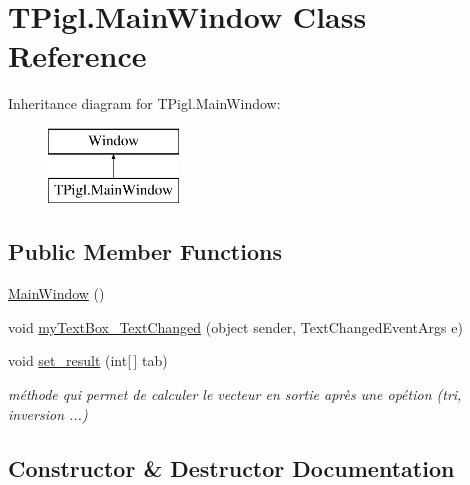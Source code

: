 \hypertarget{class_t_pigl_1_1_main_window}{}\section{T\+Pigl.\+Main\+Window Class Reference}
\label{class_t_pigl_1_1_main_window}
Inheritance diagram for T\+Pigl.\+Main\+Window\+:\begin{figure}[H]
\begin{center}
\leavevmode
\includegraphics[height=2.000000cm]{class_t_pigl_1_1_main_window}
\end{center}
\end{figure}
\subsection*{Public Member Functions}
\begin{DoxyCompactItemize}
\item 
\hyperlink{class_t_pigl_1_1_main_window_ab295945df11be4072372e118ce1d0d9b}{Main\+Window} ()
\item 
void \hyperlink{class_t_pigl_1_1_main_window_a1f2d24cc72d41c74fbe54266b45ef264}{my\+Text\+Box\+\_\+\+Text\+Changed} (object sender, Text\+Changed\+Event\+Args e)
\item 
void \hyperlink{class_t_pigl_1_1_main_window_a492d481e2c1d21f17abfc8c5dc2eac5b}{set\+\_\+result} (int\mbox{[}$\,$\mbox{]} tab)
\begin{DoxyCompactList}\small\item\em méthode qui permet de calculer le vecteur en sortie après une opétion (tri, inversion ...) \end{DoxyCompactList}\end{DoxyCompactItemize}


\subsection{Constructor \& Destructor Documentation}
\mbox{\label{class_t_pigl_1_1_main_window_ab295945df11be4072372e118ce1d0d9b}} 
